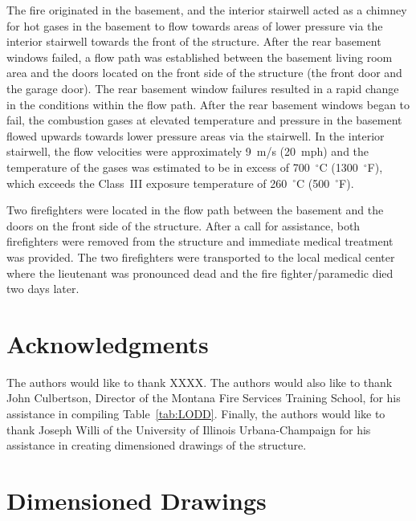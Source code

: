 \documentclass[12pt,oneside]{book}
\begin{document}
The fire originated in the basement, and the interior stairwell acted as a chimney for hot gases in the basement to flow towards areas of lower pressure via the interior stairwell towards the front of the structure. After the rear basement windows failed, a flow path was established between the basement living room area and the doors located on the front side of the structure (the front door and the garage door). The rear basement window failures resulted in a rapid change in the conditions within the flow path. After the rear basement windows began to fail, the combustion gases at elevated temperature and pressure in the basement flowed upwards towards lower pressure areas via the stairwell. In the interior stairwell, the flow velocities were approximately 9~m/s (20~mph) and the temperature of the gases was estimated to be in excess of 700~$^{\circ}$C (1300~$^{\circ}$F), which exceeds the Class~III exposure temperature of 260~$^{\circ}$C (500~$^{\circ}$F).

Two firefighters were located in the flow path between the basement and the doors on the front side of the structure. After a call for assistance, both firefighters were removed from the structure and immediate medical treatment was provided. The two firefighters were transported to the local medical center where the lieutenant was pronounced dead and the fire fighter/paramedic died two days later.


\chapter*{Acknowledgments}

The authors would like to thank XXXX. The authors would also like to thank John Culbertson, Director of the Montana Fire Services Training School, for his assistance in compiling Table~\ref{tab:LODD}. Finally, the authors would like to thank Joseph Willi of the University of Illinois Urbana-Champaign for his assistance in creating dimensioned drawings of the structure.



\appendix

\chapter{Dimensioned Drawings}
\label{sec:drawings}
\end{document}
